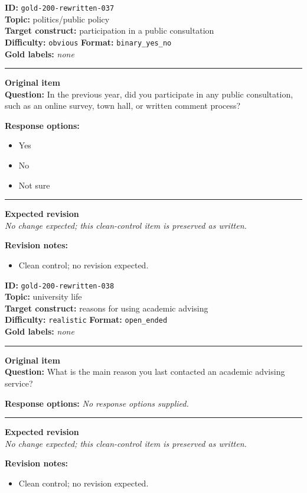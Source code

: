 \documentclass[10pt,a4paper]{article}
\newcommand{\sectionline}{\vspace{0.15em}\hrule\vspace{0.35em}}
\begin{document}
\begin{tcolorbox}[colframe=CleanGreen,colback=white,colbacktitle=CleanGreen!9,coltitle=black,title={Item 037\hfill Clean control}]
\textbf{ID:} \texttt{gold-200-rewritten-037}\\
\textbf{Topic:} politics/public policy\\
\textbf{Target construct:} participation in a public consultation\\
\textbf{Difficulty:} \texttt{obvious} \quad \textbf{Format:} \texttt{binary\_yes\_no}\\
\textbf{Gold labels:} \textit{none}\\
\sectionline
\textbf{Original item}\\
\textbf{Question:} In the previous year, did you participate in any public consultation, such as an online survey, town hall, or written comment process?
\par\textbf{Response options:}
\begin{itemize}
\item Yes
\item No
\item Not sure
\end{itemize}
\sectionline
\textbf{Expected revision}\\
\textit{No change expected; this clean-control item is preserved as written.}
\par\textbf{Revision notes:}
\begin{itemize}
\item Clean control; no revision expected.
\end{itemize}
\end{tcolorbox}
\begin{tcolorbox}[colframe=CleanGreen,colback=white,colbacktitle=CleanGreen!9,coltitle=black,title={Item 038\hfill Clean control}]
\textbf{ID:} \texttt{gold-200-rewritten-038}\\
\textbf{Topic:} university life\\
\textbf{Target construct:} reasons for using academic advising\\
\textbf{Difficulty:} \texttt{realistic} \quad \textbf{Format:} \texttt{open\_ended}\\
\textbf{Gold labels:} \textit{none}\\
\sectionline
\textbf{Original item}\\
\textbf{Question:} What is the main reason you last contacted an academic advising service?
\par\textbf{Response options:}
\textit{No response options supplied.}
\sectionline
\textbf{Expected revision}\\
\textit{No change expected; this clean-control item is preserved as written.}
\par\textbf{Revision notes:}
\begin{itemize}
\item Clean control; no revision expected.
\end{itemize}
\end{tcolorbox}
\end{document}
